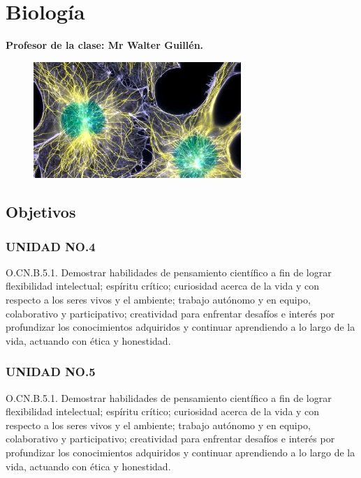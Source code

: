 \documentclass[a4paper, 12pt]{article}
\begin{document}
\section{Biología}
\textbf{Profesor de la clase: Mr Walter Guillén.}

\begin{figure}[h]
  \includegraphics[width=0.7\textwidth, center]{biologia.jpeg}
\end{figure}

\subsection{Objetivos}

\subsubsection{UNIDAD NO.4}

O.CN.B.5.1. Demostrar habilidades de pensamiento científico a fin de lograr flexibilidad intelectual; espíritu crítico; curiosidad acerca de la vida y con respecto a los seres vivos y el ambiente; trabajo autónomo y en equipo, colaborativo y participativo; creatividad para enfrentar desafíos e interés por profundizar los conocimientos adquiridos y continuar aprendiendo a lo largo de la vida, actuando con ética y honestidad.

\subsubsection{UNIDAD NO.5}

O.CN.B.5.1. Demostrar habilidades de pensamiento científico a fin de lograr flexibilidad intelectual; espíritu crítico; curiosidad acerca de la vida y con respecto a los seres vivos y el ambiente; trabajo autónomo y en equipo, colaborativo y participativo; creatividad para enfrentar desafíos e interés por profundizar los conocimientos adquiridos y continuar aprendiendo a lo largo de la vida, actuando con ética y honestidad.
\end{document}

